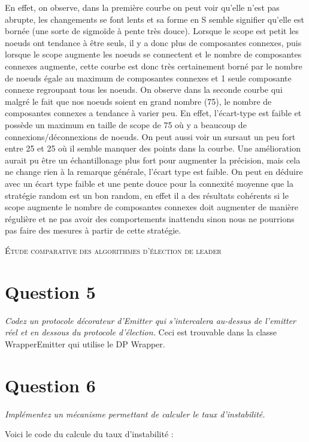 \documentclass[11pt,a4paper,sans]{report}
\begin{document}
	En effet, on observe, dans la première courbe on peut voir qu'elle n'est pas abrupte, les changements se font lents et sa forme en S semble signifier qu'elle est bornée (une sorte de sigmoïde à pente très douce). Lorsque le scope est petit les noeuds ont tendance à être seuls, il y a donc plus de composantes connexes, puis lorsque le scope augmente les noeuds se connectent et le nombre de composantes connexes augmente, cette courbe est donc très certainement borné par le nombre de noeuds égale au maximum de composantes connexes et 1 seule composante connexe regroupant tous les noeuds.
	On observe dans la seconde courbe qui malgré le fait que nos noeuds soient en grand nombre (75), le nombre de composantes connexes a tendance à varier peu. En effet, l'écart-type est faible et possède un maximum en taille de scope de 75 où y a beaucoup de connexions/déconnexions de noeuds. On peut aussi voir un sursaut un peu fort entre 25 et 25 où il semble manquer des points dans la courbe. Une amélioration aurait pu être un échantillonage plus fort pour augmenter la précision, mais cela ne change rien à la remarque générale, l'écart type est faible.
	On peut en déduire avec un écart type faible et une pente douce pour la connexité moyenne que la stratégie random est un bon random, en effet il a des résultats cohérents si le scope augmente le nombre de composantes connexes doit augmenter de manière régulière et ne pas avoir des comportements inattendu sinon nous ne pourrions pas faire des mesures à partir de cette stratégie.

	\newpage
	\begin{center}
		\textsc{\large Étude comparative des algorithmes d’élection de leader}
	\end{center}
	\section{Question 5}
	\textit{Codez un protocole décorateur d’Emitter qui s’intercalera au-dessus de l’emitter réel et en dessous du protocole d’élection.}
	Ceci est trouvable dans la classe WrapperEmitter qui utilise le DP Wrapper.

	\section{Question 6}
	\textit{Implémentez un mécanisme permettant de calculer le taux d’instabilité.}

	Voici le code du calcule du taux d'instabilité :

\end{document}
